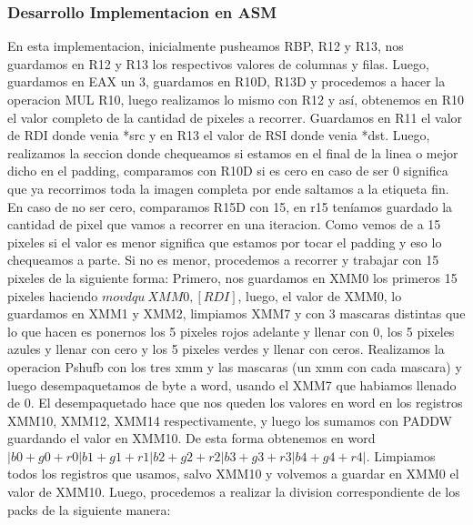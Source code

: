 \vspace*{0.3cm} \noindent
\subsubsection{Desarrollo Implementacion en ASM}
En esta implementacion, inicialmente pusheamos RBP, R12 y R13, nos guardamos en R12 y R13 los respectivos valores de columnas y filas.\newline
Luego, guardamos en EAX un 3, guardamos en R10D, R13D y procedemos a hacer la operacion MUL R10, luego realizamos lo mismo con R12 y así,
obtenemos en R10 el valor completo de la cantidad de pixeles a recorrer.\newline
Guardamos en R11 el valor de RDI donde venia *src y en R13 el valor de RSI donde venia *dst. \newline
Luego, realizamos la seccion donde chequeamos si estamos en el final de la linea o mejor dicho en el padding, comparamos con R10D si es cero \newline
en caso de ser 0 significa que ya recorrimos toda la imagen completa por ende saltamos a la etiqueta fin. \newline
En caso de no ser cero, comparamos R15D con 15, en r15 teníamos guardado la cantidad de pixel que vamos a recorrer en una iteracion.
Como vemos de a 15 pixeles si el valor es menor significa que estamos por tocar el padding y eso lo chequeamos a parte. \newline
Si no es menor, procedemos a recorrer y trabajar con 15 pixeles de la siguiente forma: \newline
Primero, nos guardamos en XMM0 los primeros 15 pixeles haciendo $ movdqu\  XMM0, [RDI]$, luego, el valor de XMM0,
lo guardamos en XMM1 y XMM2, limpiamos XMM7 y con 3 mascaras distintas que lo que hacen es ponernos los 5 pixeles rojos adelante y llenar con 0, 
los 5 pixeles azules y llenar con cero y los 5 pixeles verdes y llenar con ceros. \newline
Realizamos la operacion Pshufb con los tres xmm y las mascaras (un xmm con cada mascara) y luego desempaquetamos de byte a word,
usando el XMM7 que habiamos llenado de 0. \newline
El desempaquetado hace que nos queden los valores en word en los registros XMM10, XMM12, XMM14 respectivamente, y luego
los sumamos con PADDW guardando el valor en XMM10. De esta forma obtenemos en word 
$|b0 + g0 + r0|b1 + g1 + r1|b2 + g2 + r2|b3 + g3 + r3|b4 + g4 + r4|$. \newline
Limpiamos todos los registros que usamos, salvo XMM10 y volvemos a guardar en XMM0 el valor de XMM10. Luego, procedemos
a realizar la division correspondiente de los packs de la siguiente manera:\newline

